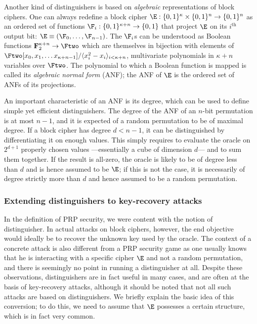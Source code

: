 \bigskip

Another kind of distinguishers is based on \emph{algebraic} representations of block ciphers. One can always redefine a block cipher
$\E : \{0,1\}^\kappa \times \{0,1\}^n \rightarrow \{0,1\}^n$ as an ordered set of functions $\F_i : \{0,1\}^{\kappa+n} \rightarrow \{0,1\}$ that project
$\E$ on its $i^\text{th}$ output bit: $\E \equiv (\F_0, \ldots, \F_{n-1})$. The $\F_i$s can be understood as Boolean functions
$\mathbf{F}_{2}^{\kappa + n} \rightarrow \Ftwo$ which are themselves in bijection with elements of
$\Ftwo[x_0,x_1,\ldots x_{\kappa + n-1}]/\langle x_i^2-x_i\rangle_{i<\kappa + n}$,
\ie multivariate polynomials in $\kappa + n$ variables over $\Ftwo$. The polynomial to which a Boolean function is mapped is called its \emph{algebraic normal form} (ANF);
the ANF of $\E$ is the ordered set of ANFs of its projections.

An important characteristic of an ANF is its degree, which can be used to define simple yet efficient distinguishers. The degree
of the ANF of an $n$-bit permutation is at most $n - 1$, and it is expected of a random permutation to be of maximal degree. If a block cipher
has degree $d < n - 1$, it can be distinguished by differentiating it on enough values. This simply requires to evaluate the oracle on $2^{d+1}$ properly chosen
values ---essentially a cube of dimension $d$--- and to sum them together. If the result is all-zero, the oracle is likely to be of degree less than
$d$ and is hence assumed to be $\E$; if this is not the case, it is necessarily of degree strictly more than $d$ and hence assumed to be a random permutation.

\subsubsection{Extending distinguishers to key-recovery attacks}

In the definition of PRP security, we were content with the notion of distinguisher. In actual attacks on block ciphers, however, the end objective
would ideally be to recover the unknown key used by the oracle. The context of a concrete attack is also different from a PRP security game as one usually knows that he is interacting with a specific
cipher $\E$ and not a random permutation, and there is seemingly no point in running a distinguisher at all.
Despite these observations, distinguishers are in fact useful in many cases, and are often at the basis of key-recovery attacks, although it
should be noted that not all such attacks are based on distinguishers.
We briefly explain
the basic idea of this conversion; to do this, we need to assume that $\E$ possesses a certain structure, which is in fact very common.


